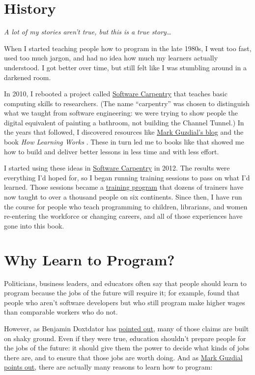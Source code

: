 \section{History}\label{s:intro-history}

\emph{A lot of my stories aren't true, but this is a true
story\ldots{}}

When I started teaching people how to program in the late 1980s, I went
too fast, used too much jargon, and had no idea how much my learners
actually understood. I got better over time, but still felt like I was
stumbling around in a darkened room.

In 2010, I rebooted a project called \href{http://software-carpentry.org}{Software Carpentry} that
teaches basic computing skills to researchers. (The name ``carpentry''
was chosen to distinguish what we taught from software engineering: we
were trying to show people the digital equivalent of painting a
bathroom, not building the Channel Tunnel.) In the years that
followed, I discovered resources like \href{http://computinged.wordpress.com}{Mark Guzdial's
blog} and the book \emph{How Learning Works}
\cite{Ambr2010}. These in turn led me to books like
\cite{Hust2012,Lemo2014,Lang2016} that showed me
how to build and deliver better lessons in less time and with less
effort.

I started using these ideas in \href{http://software-carpentry.org}{Software Carpentry} in 2012. The
results were everything I'd hoped for, so I began running training
sessions to pass on what I'd learned. Those sessions became a
\href{http://carpentries.github.io/instructor-training/}{training program} that dozens of trainers have
now taught to over a thousand people on six continents. Since then, I
have run the course for people who teach programming to children,
librarians, and women re-entering the workforce or changing careers,
and all of those experiences have gone into this book.

\section{Why Learn to Program?}\label{s:intro-why}

Politicians, business leaders, and educators often say that people
should learn to program because the jobs of the future will require it;
for example, \cite{Scaf2017} found that people who aren't software
developers but who still program make higher wages than comparable
workers who do not.

However, as Benjamin Doxtdator has \href{http://www.longviewoneducation.org/field-guide-jobs-dont-exist-yet/}{pointed out}, many
of those claims are built on shaky ground. Even if they were true,
education shouldn't prepare people for the jobs of the future: it
should give them the power to decide what kinds of jobs there are, and
to ensure that those jobs are worth doing. And as \href{https://computinged.wordpress.com/2017/10/18/why-should-we-teach-programming-hint-its-not-to-learn-problem-solving/}{Mark Guzdial points
out}, there are actually many reasons to
learn how to program:

